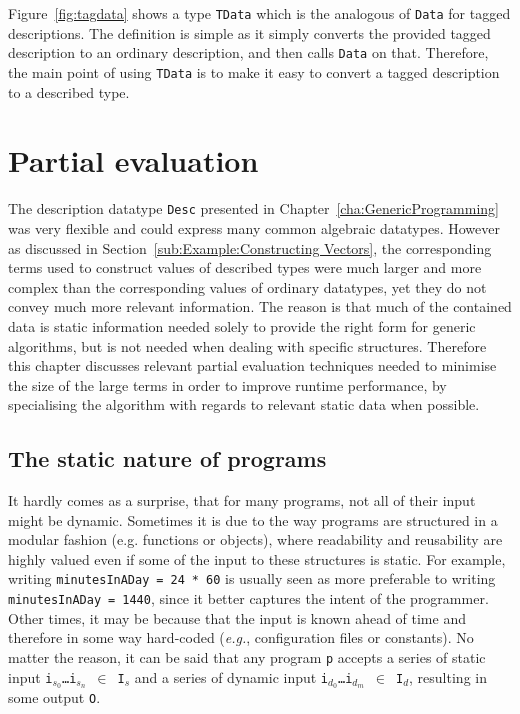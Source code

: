 \documentclass{ituthesis}
\newcommand{\tttype}[1]{\textcolor{type-color}{\texttt{#1}}}
\newcommand{\ttdec}[1]{\textcolor{declared-var-color}{\texttt{#1}}}
\newcommand{\ttvar}[1]{\textcolor{local-var-color}{\texttt{#1}}}
\newcommand{\ttliteral}[1]{\textcolor{literal-color}{\texttt{#1}}}
\theoremstyle{break}
\begin{document}
Figure~\ref{fig:tagdata} shows a type \ttdec{TData} which is the analogous of \tttype{Data} for tagged descriptions.
The definition is simple as it simply converts the provided tagged description to an ordinary description, and then calls \tttype{Data} on that.
Therefore, the main point of using \ttdec{TData} is to make it easy to convert a tagged description to a described type.



\chapter{Partial evaluation}
\label{cha:PartialEvaluation}

The description datatype \tttype{Desc} presented in Chapter~\ref{cha:GenericProgramming} was very flexible and could express many common algebraic datatypes.
However as discussed in Section~\ref{sub:Example:Constructing Vectors}, the corresponding terms used to construct values of described types were much larger and more complex than the corresponding values of ordinary datatypes, yet they do not convey much more relevant information.
The reason is that much of the contained data is static information needed solely to provide the right form for generic algorithms, but is not needed when dealing with specific structures.
Therefore this chapter discusses relevant partial evaluation techniques needed to minimise the size of the large terms in order to improve runtime performance, by specialising the algorithm with regards to relevant static data when possible.

\section{The static nature of programs}
\label{sec:Thestaticnatureofprograms}
It hardly comes as a surprise, that for many programs, not all of their input might be dynamic.
Sometimes it is due to the way programs are structured in a modular fashion (e.g. functions or objects), where readability and reusability are highly valued even if some of the input to these structures is static.
For example, writing \ttdec{minutesInADay}~\texttt{=}~\ttliteral{24}~\texttt{*}~\ttliteral{60} is usually seen as more preferable to writing \ttdec{minutesInADay}~\texttt{=}~\ttliteral{1440}, since
it better captures the intent of the programmer.
Other times, it may be because that the input is known ahead of time and therefore in some way hard-coded (\textit{e.g.}, configuration files or constants).
No matter the reason, it can be said that any program \ttdec{p} accepts a series of static input \ttvar{i$_{s_0}$}\texttt{\ldots}\ttvar{i$_{s_n}$}~\texttt{$\in$}~\ttvar{I$_{s}$} and a series of dynamic input \ttvar{i$_{d_0}$}\texttt{\ldots}\ttvar{i$_{d_m}$}~\texttt{$\in$}~\ttvar{I$_{d}$}, resulting in some output \ttvar{O}.
\end{document}
